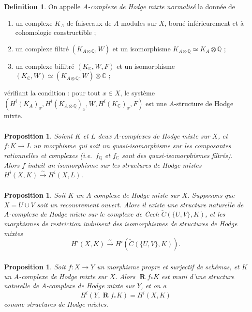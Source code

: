 \documentclass[11pt]{amsart}
\theoremstyle{plain}
\newtheorem{proposition}[theorem]{Proposition}
\theoremstyle{definition}
\newtheorem{definition}[theorem]{Definition}
\DeclareMathOperator{\Rd}{\mathbf{R}}
\newcommand{\CC}{\mathbb{C}}
\newcommand{\QQ}{\mathbb{Q}}
\begin{document}
\subsubsection{}
\begin{definition}
On appelle \emph{$A$-complexe de Hodge mixte normalis\'e} la donn\'ee de
\begin{enumerate}
\item[(i)] un complexe $K_A$ de faisceaux de $A$-modules sur $X$, born\'e inf\'erieurement et \`a cohomologie constructible ;
\item[(ii)] un complexe filtr\'e $(K_{A \otimes \QQ}, W)$ et un isomorphisme $K_{A \otimes \QQ} \simeq K_A \otimes \QQ$ ;
\item[(iii)] un complexe bifiltr\'e $(K_\CC, W, F)$ et un isomorphisme $(K_\CC, W) \simeq (K_{A \otimes \QQ}, W) \otimes \CC$ ;
\end{enumerate}
v\'erifiant la condition :
pour tout $x \in X$, le syst\`eme $(H^i(K_A)_x, H^i(K_{A \otimes \QQ})_x, W, H^i(K_\CC)_x, F)$ est une $A$-structure de Hodge mixte.
\end{definition}

\subsubsection{}
\begin{proposition}
Soient $K$ et $L$ deux $A$-complexes de Hodge mixte sur $X$, et $f : K \to L$ un morphisme qui soit un quasi-isomorphisme sur les composantes rationnelles et complexes (i.e.\ $f_\QQ$ et $f_\CC$ sont des quasi-isomorphismes filtr\'es). Alors $f$ induit un isomorphisme sur les structures de Hodge mixtes $H^i(X, K) \xrightarrow{\sim} H^i(X, L)$.
\end{proposition}

\subsubsection{}
\begin{proposition}
Soit $K$ un $A$-complexe de Hodge mixte sur $X$. Supposons que $X = U \cup V$ soit un recouvrement ouvert. Alors il existe une structure naturelle de $A$-complexe de Hodge mixte sur le complexe de \v{C}ech $\check{C}(\{U,V\}, K)$, et les morphismes de restriction induisent des isomorphismes de structures de Hodge mixtes
\[
H^i(X, K) \xrightarrow{\sim} H^i(\check{C}(\{U,V\}, K)).
\]
\end{proposition}

\subsubsection{}
\begin{proposition}
Soit $f : X \to Y$ un morphisme propre et surjectif de sch\'emas, et $K$ un $A$-complexe de Hodge mixte sur $X$. Alors $\Rd f_* K$ est muni d'une structure naturelle de $A$-complexe de Hodge mixte sur $Y$, et on a
\[
H^i(Y, \Rd f_* K) = H^i(X, K)
\]
comme structures de Hodge mixtes.
\end{proposition}
\end{document}
